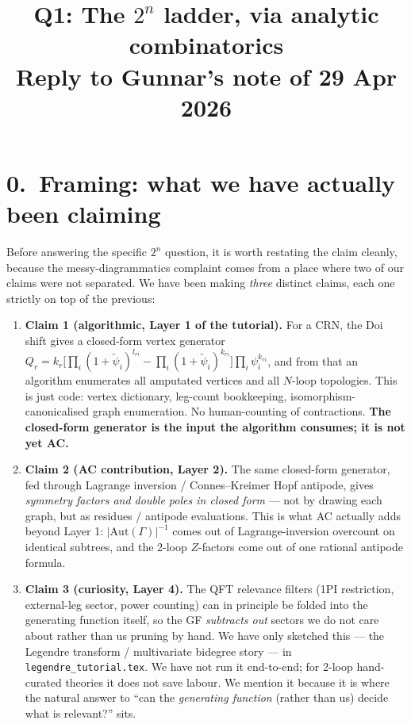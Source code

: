 \documentclass[11pt,a4paper]{article}
\title{\large Q1: The $2^n$ ladder, via analytic combinatorics\\[2pt]
\normalsize Reply to Gunnar's note of 29 Apr 2026}
\author{}
\date{}
\begin{document}
\maketitle
\vspace{-2em}

\section*{0.\ Framing: what we have actually been claiming}

Before answering the specific $2^n$ question, it is worth restating the claim cleanly,
because the messy-diagrammatics complaint comes from a place where two of our claims
were not separated.  We have been making \emph{three} distinct claims, each one strictly
on top of the previous:

\begin{enumerate}[leftmargin=2em,itemsep=4pt]
  \item \textbf{Claim 1 (algorithmic, Layer 1 of the tutorial).} For a CRN, the
        Doi shift gives a closed-form vertex generator
        $Q_r = k_r\bigl[\prod_i (1+\tilde\psi_i)^{l_{ri}} - \prod_i (1+\tilde\psi_i)^{k_{ri}}\bigr]\prod_i \psi_i^{k_{ri}}$,
        and from that an algorithm enumerates all amputated vertices and all
        $N$-loop topologies.  This is just code: vertex dictionary, leg-count
        bookkeeping, isomorphism-canonicalised graph enumeration.  No human-counting
        of contractions.  \textbf{The closed-form generator is the input the
        algorithm consumes; it is not yet AC.}
  \item \textbf{Claim 2 (AC contribution, Layer 2).} The same closed-form
        generator, fed through Lagrange inversion / Connes--Kreimer Hopf antipode,
        gives \emph{symmetry factors and double poles in closed form} --- not by
        drawing each graph, but as residues / antipode evaluations.  This is what
        AC actually adds beyond Layer 1: $|\mathrm{Aut}(\Gamma)|^{-1}$ comes out
        of Lagrange-inversion overcount on identical subtrees, and the 2-loop
        $Z$-factors come out of one rational antipode formula.
  \item \textbf{Claim 3 (curiosity, Layer 4).} The QFT relevance filters
        (1PI restriction, external-leg sector, power counting) can in principle
        be folded into the generating function itself, so the GF \emph{subtracts
        out} sectors we do not care about rather than us pruning by hand.
        We have only sketched this --- the Legendre transform / multivariate
        bidegree story --- in \texttt{legendre\_tutorial.tex}.  We have not run
        it end-to-end; for 2-loop hand-curated theories it does not save labour.
        We mention it because it is where the natural answer to ``can the
        \emph{generating function} (rather than us) decide what is relevant?''
        sits.
\end{enumerate}
\end{document}
